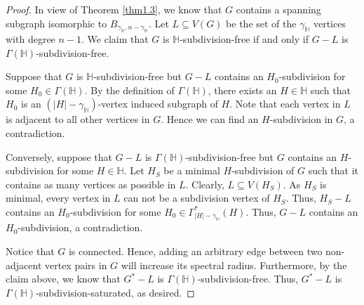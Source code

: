 \documentclass[11pt, a4paper]{article}
\theoremstyle{definition}
\newcommand{\<}{\subseteq}
\begin{document}
\begin{proof}
In view of Theorem \ref{thm1.3}, we know that $G$ contains a spanning subgraph isomorphic to $B_{\gamma_{\mathbb{H}},n-\gamma_{\mathbb{H}}}$. Let $L\subseteq V(G)$ be the set of the $\gamma_\mathbb{H}$  vertices with degree $n-1$. We claim that $G$ is $\mathbb{H}$-subdivision-free if and only if $G-L$ is $\Gamma(\mathbb{H})$-subdivision-free.
    
    Suppose  that $G$ is $\mathbb{H}$-subdivision-free but  $G-L$ contains an $H_0$-subdivision for some $H_0\in \Gamma(\mathbb{H})$.
    By the definition of $\Gamma(\mathbb{H})$, there exists an $H\in \mathbb{H}$ such that $H_0$ is an $(|H|-\gamma_\mathbb{H})$-vertex induced subgraph of $H$.
    Note that each vertex in 
$L$ is adjacent to all other vertices in $G$. Hence we can find an $H$-subdivision in $G$, a contradiction. 

    Conversely, suppose  that $G-L$ is $\Gamma(\mathbb{H})$-subdivision-free but $G$ contains an $H$-subdivision for some $H\in\mathbb{H}$.
    Let $H_S$ be a minimal $H$-subdivision of $G$ such that it contains as many vertices as possible in $L$. Clearly, $L\subseteq V(H_S)$. %
    As $H_S$ is minimal, every vertex in $L$ can not be a subdivision vertex of $H_S$. %
    Thus,  $H_S-L$ contains an $H_0$-subdivision for some $H_0\in \Gamma_{|H|-\gamma_\mathbb{H}}^*(H)$. %
    Thus, $G-L$ contains an $H_0$-subdivision, a contradiction.  %


    
 Notice that $G$ is connected. %
    Hence, adding an arbitrary  edge between two non-adjacent vertex pairs in $G$ will increase its spectral radius.
    Furthermore, by the claim above, we know that $G^*-L$ is $\Gamma(\mathbb{H})$-subdivision-free.
    Thus, $G^*-L$ is $\Gamma(\mathbb{H})$-subdivision-saturated, as desired. %
\end{proof}
\end{document}
